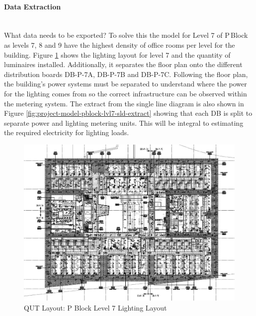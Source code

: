 \paragraph{Data Extraction}
~~\\
What data needs to be exported? To solve this the model for Level 7 of P\,Block as levels 7, 8 and 9 have the highest density of office rooms per level for the building. Figure \ref{fig:project-model-pblock-lvl7} shows the lighting layout for level 7 and the quantity of luminaires installed. Additionally, it separates the floor plan onto the different distribution boards DB-P-7A, DB-P-7B and DB-P-7C. Following the floor plan, the building's power systems must be separated to understand where the power for the lighting comes from so the correct infrastructure can be observed within the metering system. The extract from the single line diagram is also shown in Figure \ref{fig:project-model-pblock-lvl7-sld-extract} showing that each DB is split to separate power and lighting metering units. This will be integral to estimating the required electricity for lighting loads.      

\begin{figure}[H]
	\hfill\includegraphics[width = 120mm]{images/project-model/qut-lvl7-lighting}\hspace*{\fill}
	\caption{QUT Layout: P Block Level 7 Lighting Layout} 
	\label{fig:project-model-pblock-lvl7}
\end{figure}

